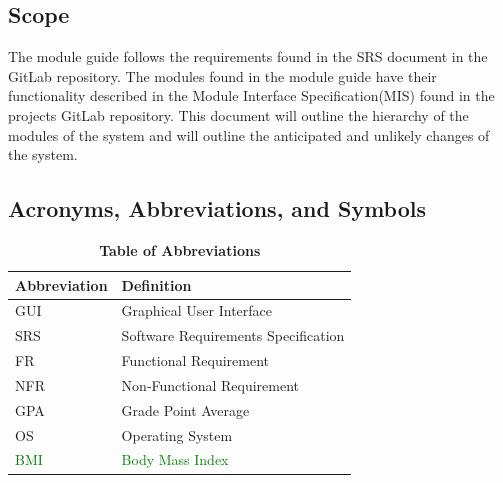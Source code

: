 \documentclass[12pt, titlepage]{article}
\begin{document}
\subsection{Scope}
The module guide follows the requirements found in the SRS document in the GitLab repository. The modules found in the module guide have their functionality described in the Module Interface Specification(MIS) found in the projects GitLab repository. This document will outline the hierarchy of the modules of the system and will outline the anticipated and unlikely changes of the system.
\subsection{Acronyms, Abbreviations, and Symbols}

\begin{table}[H]
\caption{\textbf{Table of Abbreviations}} \label{Table}
\begin{tabularx}{\textwidth}{p{3cm}X}
\toprule
\textbf{Abbreviation} & \textbf{Definition} \\
\midrule
GUI & Graphical User Interface\\
SRS & Software Requirements Specification\\
FR & Functional Requirement\\
NFR & Non-Functional Requirement\\
GPA & Grade Point Average\\
OS & Operating System\\
\textcolor{Green}{BMI} & \textcolor{Green}{Body Mass Index}\\
\bottomrule
\end{tabularx}

\end{table}
\end{document}
